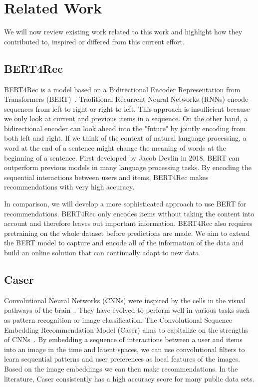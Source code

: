 \section{Related Work}
\label{section:related_work}

We will now review existing work related to this work and highlight how they contributed to, inspired or differed from this current effort.

\subsection{BERT4Rec}
BERT4Rec is a model based on a Bidirectional Encoder Representation from Transformers (BERT)~\cite{sun2019bert4rec, devlin2018bert}. Traditional Recurrent Neural Networks (RNNs) encode sequences from left to right or right to left. This approach is insufficient because we only look at current and previous items in a sequence. On the other hand, a bidirectional encoder can look ahead into the "future" by jointly encoding from both left and right. If we think of the context of natural language processing, a word at the end of a sentence might change the meaning of words at the beginning of a sentence. First developed by Jacob Devlin in 2018, BERT can outperform previous models in many language processing tasks. By encoding the sequential interactions between users and items, BERT4Rec makes recommendations with very high accuracy. 

In comparison, we will develop a more sophisticated approach to use BERT for recommendations. BERT4Rec only encodes items without taking the content into account and therefore leaves out important information. BERT4Rec also requires pretraining on the whole dataset before predictions are made. We aim to extend the BERT model to capture and encode all of the information of the data and build an online solution that can continually adapt to new data.

\subsection{Caser}
Convolutional Neural Networks (CNNs) were inspired by the cells in the visual pathways of the brain~\cite{hubel1968receptive}. They have evolved to perform well in various tasks such as pattern recognition or image classification. The Convolutional Sequence Embedding Recommendation Model (Caser) aims to capitalize on the strengths of CNNs~\cite{tang2018personalized}. By embedding a sequence of interactions between a user and items into an image in the time and latent spaces, we can use convolutional filters to learn sequential patterns and user preferences as local features of the images. Based on the image embeddings we can then make recommendations. In the literature, Caser consistently has a high accuracy score for many public data sets.

